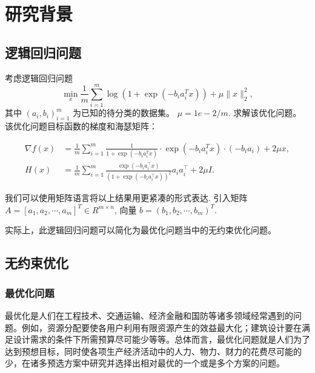 \setlength{\headheight}{13pt}
\chapter{\hei \textbf{研究背景}}

\section{\hei 逻辑回归问题}

   	考虑逻辑回归问题
$$
\min _{x} \frac{1}{m} \sum_{i=1}^{m} \log \left(1+\exp \left(-b_{i} a_{i}^{T} x\right)\right)+\mu\|x\|_{2}^{2},
$$
其中 $\left(a_{i}, b_{i}\right)_{i=1}^{m}$ 为已知的待分类的数据集。 $\mu=1 e-2 / m$. 求解该优化问题。 该优化问题目标函数的梯度和海瑟矩阵：

$$
\begin{aligned}
	\nabla f(x) &=\frac{1}{m} \sum_{i=1}^{m} \frac{1}{1+\exp \left(-b_{i} a_{i}^{T} x\right)} \cdot \exp \left(-b_{i} a_{i}^{T} x\right) \cdot\left(-b_{i} a_{i}\right)+2 \mu x, \\
	H(x) &=\frac{1}{m} \sum_{i=1}^{m} \frac{\exp \left(-b_{i} a_{i}^{\top} x\right)}{\left(1+\exp \left(-b_{i} a_{i}^{\top} x\right)\right)^{2}} a_{i} a_{i}^{\top}+2 \mu I .
\end{aligned}
$$

我们可以使用矩阵语言将以上结果用更紧凑的形式表达. 引入矩阵 $A=\left[a_{1}, a_{2}, \cdots, a_{m}\right]^{T} \in R^{m \times n}$, 向量 $b=\left(b_{1}, b_{2}, \cdots, b_{m}\right)^{T}$.

{\hei 实际上，此逻辑回归问题可以简化为最优化问题当中的无约束优化问题。}


\section{\hei 无约束优化}
\subsection{最优化问题}

最优化是人们在工程技术、交通运输、经济金融和国防等诸多领域经常遇到的问题。例如，资源分配要使各用户利用有限资源产生的效益最大化；建筑设计要在满足设计需求的条件下所需预算尽可能少等等。总体而言，最优化问题就是人们为了达到预想目标，同时使各项生产经济活动中的人力、物力、财力的花费尽可能的少，在诸多预选方案中研究并选择出相对最优的一个或是多个方案的问题。


